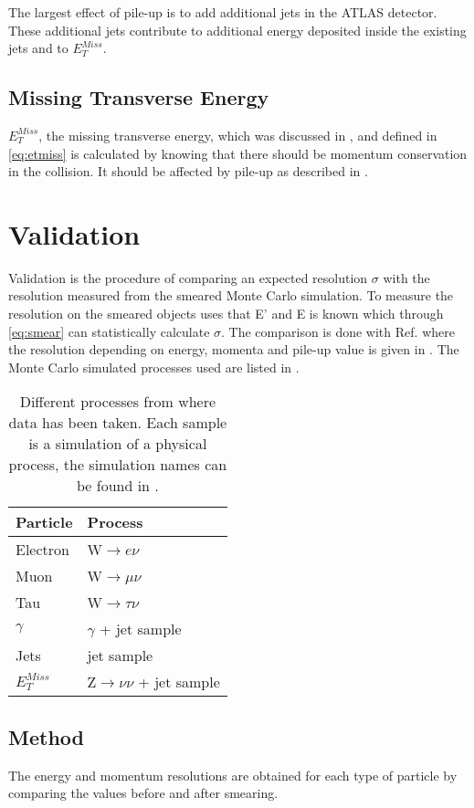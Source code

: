 The largest effect of pile-up is to add additional jets in the ATLAS detector. These additional jets contribute to additional energy deposited inside the existing jets and to $E^{Miss}_T$.
\subsection{Missing Transverse Energy}
$E_T^{Miss}$, the missing transverse energy, which was discussed in , and defined in \eqref{eq:etmiss} is calculated by knowing that there should be momentum conservation in the collision. It should be affected by pile-up as described in .

\newpage
\section{Validation}\label{sec:vali}
Validation is the procedure of comparing an expected resolution $\sigma$ with the resolution measured from the smeared Monte Carlo simulation. To measure the resolution on the smeared objects uses that E' and E is known which through \eqref{eq:smear} can statistically calculate $\sigma$. The comparison is done with Ref. \citep{ATL-PHYS-PUB-2013-004} where the resolution depending on energy, momenta and pile-up value is given in . The Monte Carlo simulated processes used are listed in . 

\begin{SCtable}[][ht]
\begin{tabular}{|l|l|}
\hline
Particle & Process \\ \hline
Electron & W$\rightarrow e\nu$ \\
Muon & W$\rightarrow \mu \nu$ \\
Tau & W$\rightarrow \tau \nu$ \\
$\gamma$ & $\gamma$ + jet sample \\
Jets & jet sample \\
$E_T^{Miss}$ & Z$\rightarrow \nu \nu$ + jet sample \\ \hline
\end{tabular}
\caption{Different processes from where data has been taken. Each sample is a simulation of a physical process, the simulation names can be found in .}
\label{tab:backproc}
\end{SCtable}

\subsection{Method}
The energy and momentum resolutions are obtained for each type of particle by comparing the values before and after smearing.

